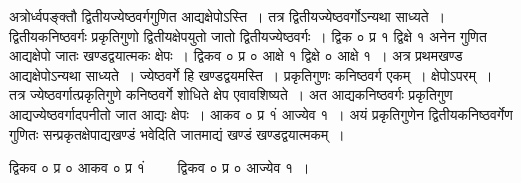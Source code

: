 \documentclass[11pt, openany]{book}
\begin{document}
\begin{sloppypar}
अत्रोर्ध्वपङ्क्तौ द्वितीयज्येष्ठवर्गगुणित आद्यक्षेपोऽस्ति~। तत्र द्वितीयज्येष्ठवर्गोऽन्यथा साध्यते~। द्वितीयकनिष्ठवर्गः प्रकृतिगुणो द्वितीयक्षेपयुतो जातो द्वितीयज्येष्ठवर्गः~। द्विक ० प्र १ द्विक्षे १ अनेन गुणित आद्यक्षेपो जातः खण्डद्वयात्मकः क्षेपः~। द्विकव ० प्र ० आक्षे १ द्विक्षे ० आक्षे १~। अत्र प्रथमखण्ड आद्यक्षेपोऽन्यथा साध्यते~। ज्येष्ठवर्गे हि खण्डद्वयमस्ति~। प्रकृतिगुणः कनिष्ठवर्ग एकम्~। क्षेपोऽपरम्~। तत्र ज्येष्ठवर्गात्प्रकृतिगुणे कनिष्ठवर्गे शोधिते क्षेप एवावशिष्यते~। अत आद्यकनिष्ठवर्गः प्रकृतिगुण आद्यज्येष्ठवर्गादपनीतो जात आद्यः क्षेपः~। आकव ० प्र १ं आज्येव १~। अयं प्रकृतिगुणेन द्वितीयकनिष्ठवर्गेण गुणितः सन्प्रकृतक्षेपाद्यखण्डं भवेदिति जातमाद्यं खण्डं खण्डद्वयात्मकम्~।

\begin{center}
द्विकव ० प्र ० आकव ० प्र १ं ~~~~द्विकव ० प्र ० आज्येव १~।
\end{center}
\end{sloppypar}

\newpage
\end{document}
